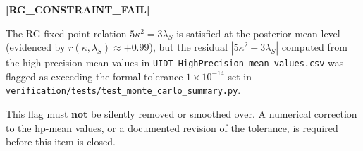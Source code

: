\textbf{[RG\_CONSTRAINT\_FAIL]}

The RG fixed-point relation $5\kappa^2 = 3\lambda_S$ is satisfied at the
posterior-mean level (evidenced by $r(\kappa, \lambda_S)\approx+0.99$),
but the residual $|5\kappa^2 - 3\lambda_S|$ computed from the
high-precision mean values in
\verb|UIDT_HighPrecision_mean_values.csv| was flagged as exceeding
the formal tolerance $1\times10^{-14}$ set in
\verb|verification/tests/test_monte_carlo_summary.py|.

This flag must \textbf{not} be silently removed or smoothed over.
A numerical correction to the hp-mean values, or a documented revision
of the tolerance, is required before this item is closed.

